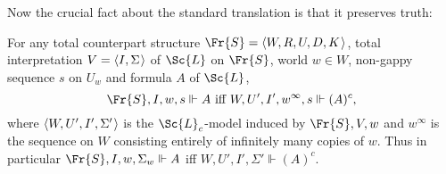 \documentclass[11pt]{woarticle}
\theoremstyle{break}
\theoremstyle{nonumberplain}
\newcommand{\SAT}{\Vdash}
\newcommand{\1}{\;\,|\;\,}
\newcommand{\trans}[1]{(#1)^c}
\renewcommand{\t}[1]{\ensuremath{\langle #1  \makebox[.2ex]{}\rangle}}
\begin{document}
{Now the crucial fact about the standard translation is that it
preserves truth:

\begin{theorem}{\label{localcorr}}
  For any total counterpart structure $\Fr{S} = \t{W,R,U,D,K}$, total
  interpretation $V=\t{I,\Sigma}$ of $\Sc{L}$ on $\Fr{S}$, world $w
  \in W$, non-gappy sequence $s$ on $U_w$ and formula $A$ of $\Sc{L}$,
  \[
  \Fr{S},I,w,s \SAT A \text{ iff } W,U',I',w^\infty,s \SAT \trans{A},
  \]
  where $\t{W,U',I',\Sigma'}$ is the $\Sc{L}_c$-model induced by
  $\Fr{S},V,w$ and $w^\infty$ is the sequence on $W$ consisting
  entirely of infinitely many copies of $w$. Thus in particular
  $\Fr{S},I,w,\Sigma_w \SAT A$ iff $W,U',I',\Sigma' \SAT \trans{A}$.
\end{theorem}

}
\end{document}
